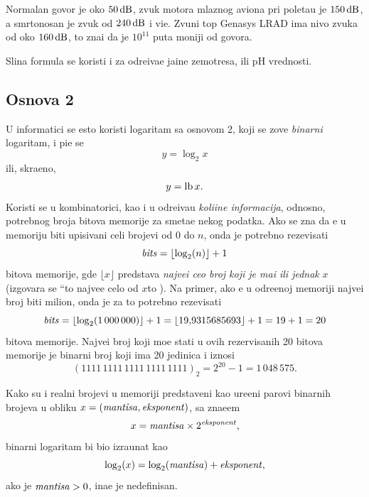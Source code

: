 \documentclass[12pt, twoside, a4paper]{article}
\def\navod#1{\leavevmode\setbox\qqbox\hbox{``}\hbox to \wd\qqbox{,\hss,}#1\hbox to \wd\qqbox{`\hss`}}
\def\logtwo{\log_2}
\def\puta{\times}
\def\.{\smash{,}\vphantom{.}}
\def\um#1{\,{\rm#1}}
\begin{document}
Normalan govor je oko $50\um{dB}$, 
zvuk motora mlaznog aviona pri poleta{\nj}u je $150\um{dB}$, 
a smrtonosan je zvuk od $240\um{dB}$ i vi{\sv}e.
Zvu{\cv}ni top {\sf Genasys LRAD} ima nivo zvuka od oko $160\um{dB}$,
{\sv}to zna{\cv}i da je $10^{11}$ puta mo{\cc}niji od govora.

Sli{\cv}na formula se koristi i za odre{\dj}iva{\nj}e ja{\cv}ine zem{\lj}otresa, 
ili pH
vrednosti.

\subsection{Osnova 2}

\def\lb{\mathop{\rm lb}}
\def\bits{{\it bits}}
\def\mant{{\it mantisa}}%
\def\expo{{\it eksponent}}%
\def\znak{{\it znak}}%

U informatici se {\cv}esto koristi logaritam sa osnovom 2, koji se zove {\sl binarni\/} logaritam,
i pi{\sv}e se
$$
y=\logtwo x
$$
ili, skra{\cc}eno,
$$
y=\lb x.
$$
Koristi se u kombinatorici, kao i u odre{\dj}iva{\nj}u {\sl koli{\cv}ine informacija},
odnosno, potrebnog broja bitova me\-mo\-ri\-je za sme{\sv}ta{\nj}e nekog podatka.
Ako se zna da {\cc}e u me\-mo\-ri\-ju biti upisivani celi brojevi od 0 do $n$, onda je potrebno rezevisati
\begin{equation}\label{eq:bits}
  \bits = \lfloor\logtwo(n)\rfloor+1
\end{equation}
bitova memorije, gde $\lfloor x\rfloor$ predstav{\lj}a {\sl najve{\cc}i ceo broj koji je ma{\nj}i ili jednak} $x$
(izgovara se \navod{najve{\cc}e celo od $x$}). 
Na primer, ako {\cc}e u odre{\dj}enoj memoriji najve{\cc}i 
broj biti milion, onda je za to potrebno rezevisati
$$
\bits=\lfloor\logtwo(1\,000\,000)\rfloor+1=\lfloor 19\.9315685693\rfloor+1 = 19+1=20
$$
bitova memorije. Najve{\cc}i broj koji mo{\zv}e stati u ovih rezervisanih 20 bitova memorije je binarni broj koji ima 20 jedinica
i iznosi 
$$
(1111\,1111\,1111\,1111\,1111)_2=
2^{20}-1=1\,048\,575.
$$

Kako su i realni brojevi u memoriji predstav{\lj}eni kao ure{\dj}eni parovi binarnih brojeva u obliku
$x=(\mant,\expo)$, sa zna{\cv}e{\nj}em
$$
x=\mant\puta2^\expo,
$$
binarni logaritam bi bio izra{\cv}unat kao
$$
\logtwo(x)=\logtwo(\mant)+\expo,
$$
ako je $\mant>0$, ina{\cv}e je nedefinisan.
\end{document}
